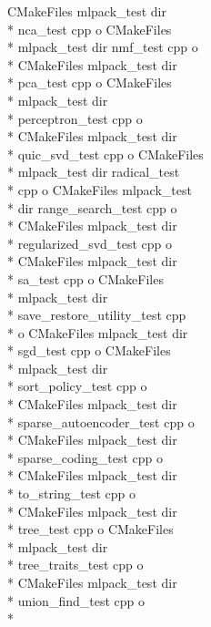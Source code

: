\begin{DoxyCompactItemize}
C\-Make\-Files mlpack\-\_\-test dir \\*
nca\-\_\-test cpp o C\-Make\-Files \\*
mlpack\-\_\-test dir nmf\-\_\-test cpp o \\*
C\-Make\-Files mlpack\-\_\-test dir \\*
pca\-\_\-test cpp o C\-Make\-Files \\*
mlpack\-\_\-test dir \\*
perceptron\-\_\-test cpp o \\*
C\-Make\-Files mlpack\-\_\-test dir \\*
quic\-\_\-svd\-\_\-test cpp o C\-Make\-Files \\*
mlpack\-\_\-test dir radical\-\_\-test \\*
cpp o C\-Make\-Files mlpack\-\_\-test \\*
dir range\-\_\-search\-\_\-test cpp o \\*
C\-Make\-Files mlpack\-\_\-test dir \\*
regularized\-\_\-svd\-\_\-test cpp o \\*
C\-Make\-Files mlpack\-\_\-test dir \\*
sa\-\_\-test cpp o C\-Make\-Files \\*
mlpack\-\_\-test dir \\*
save\-\_\-restore\-\_\-utility\-\_\-test cpp \\*
o C\-Make\-Files mlpack\-\_\-test dir \\*
sgd\-\_\-test cpp o C\-Make\-Files \\*
mlpack\-\_\-test dir \\*
sort\-\_\-policy\-\_\-test cpp o \\*
C\-Make\-Files mlpack\-\_\-test dir \\*
sparse\-\_\-autoencoder\-\_\-test cpp o \\*
C\-Make\-Files mlpack\-\_\-test dir \\*
sparse\-\_\-coding\-\_\-test cpp o \\*
C\-Make\-Files mlpack\-\_\-test dir \\*
to\-\_\-string\-\_\-test cpp o \\*
C\-Make\-Files mlpack\-\_\-test dir \\*
tree\-\_\-test cpp o C\-Make\-Files \\*
mlpack\-\_\-test dir \\*
tree\-\_\-traits\-\_\-test cpp o \\*
C\-Make\-Files mlpack\-\_\-test dir \\*
union\-\_\-find\-\_\-test cpp o \\*

\end{DoxyCompactItemize}

